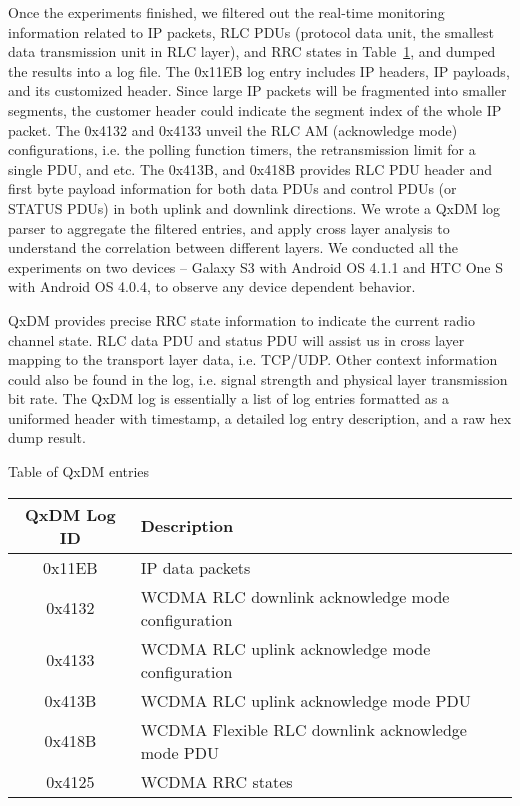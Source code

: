 \begin{TReports}
Once the experiments finished, we filtered out the real-time monitoring information related to IP packets, RLC PDUs (protocol data unit, the smallest data transmission unit in RLC layer), and RRC states in Table~\ref{tab:QxDM.logs}, and dumped the results into a log file. The 0x11EB log entry includes IP headers, IP payloads, and its customized header. Since large IP packets will be fragmented into smaller segments, the customer header could indicate the segment index of the whole IP packet. The 0x4132 and 0x4133 unveil the RLC AM (acknowledge mode) configurations, i.e. the polling function timers, the retransmission limit for a single PDU, and etc. The 0x413B, and 0x418B provides RLC PDU header and first byte payload information for both data PDUs and control PDUs (or STATUS PDUs) in both uplink and downlink directions. We wrote a QxDM log parser to aggregate the filtered entries, and apply cross layer analysis to understand the correlation between different layers. We conducted all the experiments on two devices -- Galaxy S3 with Android OS 4.1.1 and HTC One S with Android OS 4.0.4, to observe any device dependent behavior.


QxDM provides precise RRC state information to indicate the current radio channel state. RLC data PDU and status PDU will assist us in cross layer mapping to the transport layer data, i.e. TCP/UDP. Other context information could also be found in the log, i.e. signal strength and physical layer transmission bit rate. The QxDM log is essentially a list of log entries formatted as a uniformed header with timestamp, a detailed log entry description, and a raw hex dump result.  

 Table of QxDM entries
\begin{table}[t!]
\begin{tabularx}{0.5\textwidth}{ | c | X | }
	\hline
  	\textbf{QxDM Log ID} & \textbf{Description} \\
  	\hline\hline
  	0x11EB & IP data packets \\
  	\hline
  	0x4132 & WCDMA RLC downlink acknowledge mode configuration \\
  	\hline
  	0x4133 & WCDMA RLC uplink acknowledge mode configuration \\
  	\hline
  	0x413B & WCDMA RLC uplink acknowledge mode PDU \\
  	\hline
  	0x418B & WCDMA Flexible RLC downlink acknowledge mode PDU \\
  	\hline
  	0x4125 & WCDMA RRC states \\
  	\hline
\end{tabularx}
\label{tab:QxDM.logs}
\end{table}
\end{TReports}


